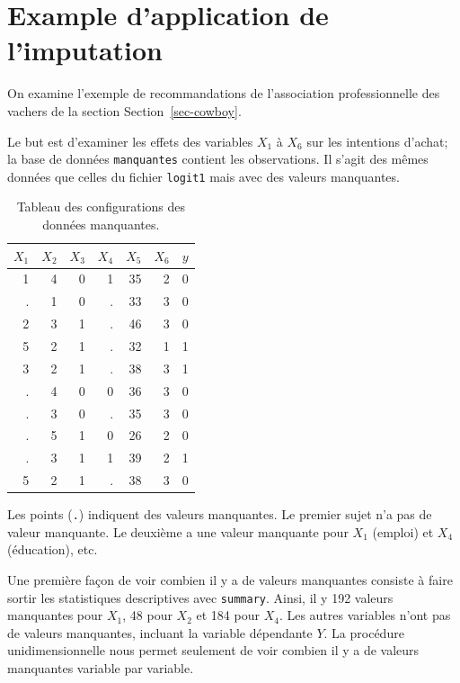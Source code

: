 \documentclass[
  11pt,
  letterpaper,
]{book}
\theoremstyle{definition}
\theoremstyle{remark}
\begin{document}
\hypertarget{example-dapplication-de-limputation}{%
\section{Example d'application de
l'imputation}\label{example-dapplication-de-limputation}}

On examine l'exemple de recommandations de l'association professionnelle
des vachers de la section Section~\ref{sec-cowboy}.

Le but est d'examiner les effets des variables \(X_1\) à \(X_6\) sur les
intentions d'achat; la base de données \texttt{manquantes} contient les
observations. Il s'agit des mêmes données que celles du fichier
\texttt{logit1} mais avec des valeurs manquantes.

\hypertarget{tbl-missing1r}{}
\begin{table}
\caption{\label{tbl-missing1r}Tableau des configurations des données manquantes. }\tabularnewline

\centering
\begin{tabular}{rrrrrrr}
\toprule
\(X_1\) & \(X_2\) & \(X_3\) & \(X_4\) & \(X_5\) & \(X_6\) & \(y\)\\
\midrule
1 & 4 & 0 & 1 & 35 & 2 & 0\\
. & 1 & 0 & . & 33 & 3 & 0\\
2 & 3 & 1 & . & 46 & 3 & 0\\
5 & 2 & 1 & . & 32 & 1 & 1\\
3 & 2 & 1 & . & 38 & 3 & 1\\
\addlinespace
. & 4 & 0 & 0 & 36 & 3 & 0\\
. & 3 & 0 & . & 35 & 3 & 0\\
. & 5 & 1 & 0 & 26 & 2 & 0\\
. & 3 & 1 & 1 & 39 & 2 & 1\\
5 & 2 & 1 & . & 38 & 3 & 0\\
\bottomrule
\end{tabular}
\end{table}

Les points (\texttt{.}) indiquent des valeurs manquantes. Le premier
sujet n'a pas de valeur manquante. Le deuxième a une valeur manquante
pour \(X_1\) (emploi) et \(X_4\) (éducation), etc.

Une première façon de voir combien il y a de valeurs manquantes consiste
à faire sortir les statistiques descriptives avec \texttt{summary}.
Ainsi, il y 192 valeurs manquantes pour \(X_1\), 48 pour \(X_2\) et 184
pour \(X_4\). Les autres variables n'ont pas de valeurs manquantes,
incluant la variable dépendante \(Y\). La procédure unidimensionnelle
nous permet seulement de voir combien il y a de valeurs manquantes
variable par variable.
\end{document}
